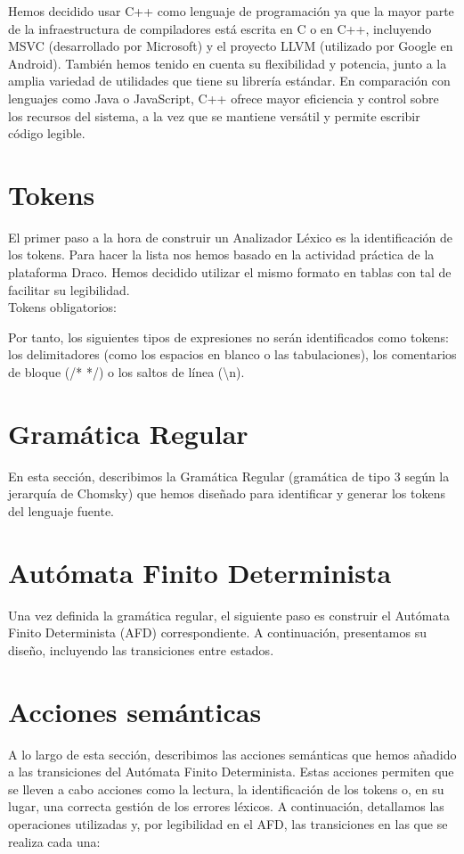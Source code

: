 \documentclass{article}
\begin{document}
Hemos decidido usar C++ como lenguaje de programación ya que la mayor parte de la infraestructura de compiladores está escrita en C o en C++, incluyendo MSVC (desarrollado por Microsoft) y el proyecto LLVM (utilizado por Google en Android). También hemos tenido en cuenta su flexibilidad y potencia, junto a la amplia variedad de utilidades que tiene su librería estándar. En comparación con lenguajes como Java o JavaScript, C++ ofrece mayor eficiencia y control sobre los recursos del sistema, a la vez que se mantiene versátil y permite escribir código legible.

\newpage

\section{Tokens}
El primer paso a la hora de construir un Analizador Léxico es la identificación de los tokens. Para hacer la lista nos hemos basado en la actividad práctica de la plataforma Draco. Hemos decidido utilizar el mismo formato en tablas con tal de facilitar su legibilidad.\\
Tokens obligatorios:



Por tanto, los siguientes tipos de expresiones no serán identificados como tokens: los delimitadores (como los espacios en blanco o las tabulaciones), los comentarios de bloque (/* */) o los saltos de línea (\textbackslash n).

\section{Gramática Regular}

En esta sección, describimos la Gramática Regular (gramática de tipo 3 según la jerarquía de Chomsky) que hemos diseñado para identificar y generar los tokens del lenguaje fuente. 



\section{Autómata Finito Determinista}
Una vez definida la gramática regular, el siguiente paso es construir el Autómata Finito Determinista (AFD) correspondiente. A continuación, presentamos su diseño, incluyendo las transiciones entre estados.



\section{Acciones semánticas}
A lo largo de esta sección, describimos las acciones semánticas que hemos añadido a las transiciones del Autómata Finito Determinista. Estas acciones permiten que se lleven a cabo acciones como la lectura, la identificación de los tokens o, en su lugar, una correcta gestión de los errores léxicos. A continuación, detallamos las operaciones utilizadas y, por legibilidad en el AFD, las transiciones en las que se realiza cada una:\\

\end{document}
